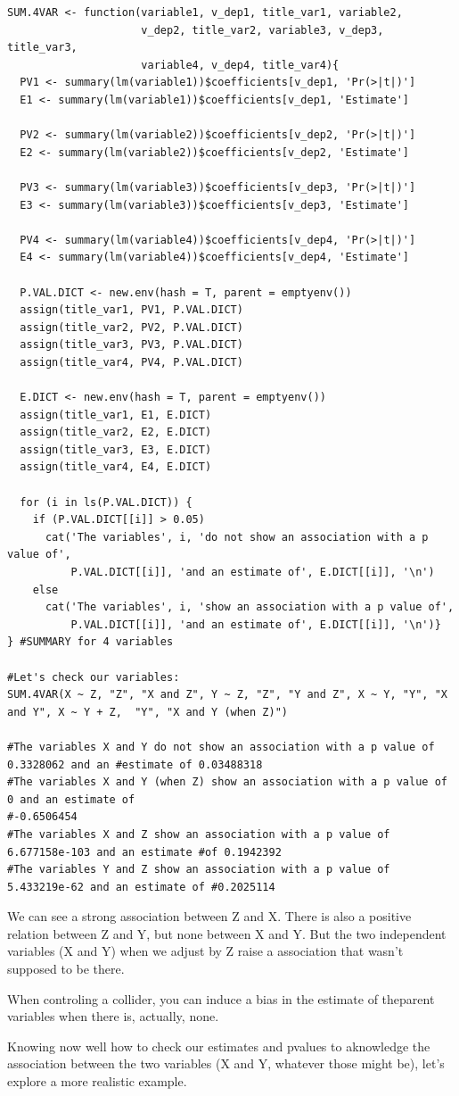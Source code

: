 \documentclass{article}
\begin{document}
\begin{lstlisting}
SUM.4VAR <- function(variable1, v_dep1, title_var1, variable2, 
                     v_dep2, title_var2, variable3, v_dep3, title_var3, 
                     variable4, v_dep4, title_var4){
  PV1 <- summary(lm(variable1))$coefficients[v_dep1, 'Pr(>|t|)']
  E1 <- summary(lm(variable1))$coefficients[v_dep1, 'Estimate']
  
  PV2 <- summary(lm(variable2))$coefficients[v_dep2, 'Pr(>|t|)']
  E2 <- summary(lm(variable2))$coefficients[v_dep2, 'Estimate']
  
  PV3 <- summary(lm(variable3))$coefficients[v_dep3, 'Pr(>|t|)']
  E3 <- summary(lm(variable3))$coefficients[v_dep3, 'Estimate']
  
  PV4 <- summary(lm(variable4))$coefficients[v_dep4, 'Pr(>|t|)']
  E4 <- summary(lm(variable4))$coefficients[v_dep4, 'Estimate']
  
  P.VAL.DICT <- new.env(hash = T, parent = emptyenv())
  assign(title_var1, PV1, P.VAL.DICT)
  assign(title_var2, PV2, P.VAL.DICT)
  assign(title_var3, PV3, P.VAL.DICT)
  assign(title_var4, PV4, P.VAL.DICT)
  
  E.DICT <- new.env(hash = T, parent = emptyenv())
  assign(title_var1, E1, E.DICT)
  assign(title_var2, E2, E.DICT)
  assign(title_var3, E3, E.DICT)
  assign(title_var4, E4, E.DICT)
  
  for (i in ls(P.VAL.DICT)) {
    if (P.VAL.DICT[[i]] > 0.05)
      cat('The variables', i, 'do not show an association with a p value of',  
          P.VAL.DICT[[i]], 'and an estimate of', E.DICT[[i]], '\n')
    else
      cat('The variables', i, 'show an association with a p value of',  
          P.VAL.DICT[[i]], 'and an estimate of', E.DICT[[i]], '\n')}
} #SUMMARY for 4 variables

#Let's check our variables:
SUM.4VAR(X ~ Z, "Z", "X and Z", Y ~ Z, "Z", "Y and Z", X ~ Y, "Y", "X and Y", X ~ Y + Z,  "Y", "X and Y (when Z)")
         
#The variables X and Y do not show an association with a p value of 0.3328062 and an #estimate of 0.03488318 
#The variables X and Y (when Z) show an association with a p value of 0 and an estimate of 
#-0.6506454 
#The variables X and Z show an association with a p value of 6.677158e-103 and an estimate #of 0.1942392 
#The variables Y and Z show an association with a p value of 5.433219e-62 and an estimate of #0.2025114

\end{lstlisting}

We can see a strong association between Z and X. There is also a positive relation between Z and Y, but none between X and Y. But the two independent  variables (X and Y) when we adjust by Z raise a association that wasn't supposed to be there.\par
When controling a collider, you can induce a bias in the estimate of theparent variables when there is, actually, none.\par
Knowing now well how to check our estimates and pvalues to aknowledge the association between the two variables (X and Y, whatever those might be), let's explore a more realistic example.\par
\end{document}
